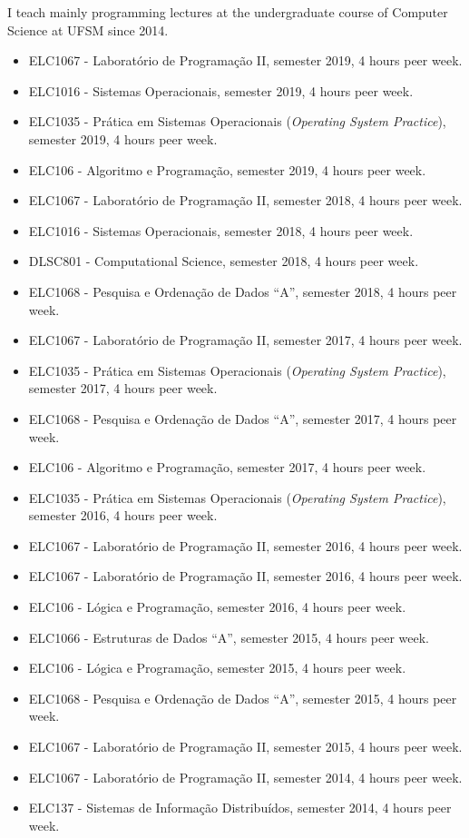 \documentclass[11pt,a4paper]{article}
\begin{document}
I teach mainly programming lectures at the undergraduate course of Computer
Science at UFSM since 2014.
\begin{itemize}
\item ELC1067 - Laboratório de Programação II,  semester 2019, 4 hours peer week.
\item ELC1016 - Sistemas Operacionais,  semester 2019, 4 hours peer week.
	\item ELC1035 - Prática em Sistemas Operacionais (\emph{Operating System Practice}),  semester 2019, 4 hours peer week.
	\item ELC106 - Algoritmo e Programação,  semester 2019, 4 hours peer week.
\item ELC1067 - Laboratório de Programação II,  semester 2018, 4 hours peer week.
\item ELC1016 - Sistemas Operacionais,  semester 2018, 4 hours peer week.
%
\item DLSC801 - Computational Science,  semester 2018, 4 hours peer week.
\item ELC1068 - Pesquisa e Ordenação de Dados ``A'',  semester 2018, 4 hours peer week. 
%
\item ELC1067 - Laboratório de Programação II,  semester 2017, 4 hours peer week.
\item ELC1035 - Prática em Sistemas Operacionais (\emph{Operating System Practice}),  semester 2017, 4 hours peer week.
%
\item ELC1068 - Pesquisa e Ordenação de Dados ``A'',  semester 2017, 4 hours peer week. 
\item ELC106 - Algoritmo e Programação,  semester 2017, 4 hours peer week.
%
\item ELC1035 - Prática em Sistemas Operacionais (\emph{Operating System Practice}),  semester 2016, 4 hours peer week.
\item ELC1067 - Laboratório de Programação II,  semester 2016, 4 hours peer week.
\item ELC1067 - Laboratório de Programação II,  semester 2016, 4 hours peer week.
\item ELC106 - Lógica e Programação,  semester 2016, 4 hours peer week.
\item ELC1066 - Estruturas de Dados ``A'',  semester 2015, 4 hours peer week.
\item ELC106 - Lógica e Programação,  semester 2015, 4 hours peer week.
\item ELC1068 - Pesquisa e Ordenação de Dados ``A'',  semester 2015, 4 hours peer week. 
\item ELC1067 - Laboratório de Programação II,  semester 2015, 4 hours peer week.
\item ELC1067 - Laboratório de Programação II,  semester 2014, 4 hours peer week.
\item ELC137 - Sistemas de Informação Distribuídos,  semester 2014, 4 hours peer week.
\end{itemize}
\end{document}
